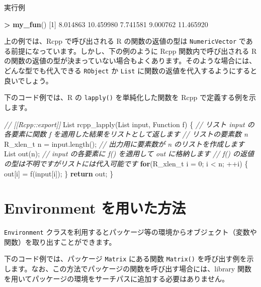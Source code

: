 \documentclass[]{book}
\newenvironment{Shaded}{\begin{snugshade}}{\end{snugshade}}
\newcommand{\CommentTok}[1]{\textcolor[rgb]{0.56,0.35,0.01}{\textit{#1}}}
\newcommand{\ControlFlowTok}[1]{\textcolor[rgb]{0.13,0.29,0.53}{\textbf{#1}}}
\newcommand{\DataTypeTok}[1]{\textcolor[rgb]{0.13,0.29,0.53}{#1}}
\newcommand{\DecValTok}[1]{\textcolor[rgb]{0.00,0.00,0.81}{#1}}
\newcommand{\FloatTok}[1]{\textcolor[rgb]{0.00,0.00,0.81}{#1}}
\newcommand{\KeywordTok}[1]{\textcolor[rgb]{0.13,0.29,0.53}{\textbf{#1}}}
\newcommand{\NormalTok}[1]{#1}
\newcommand{\OperatorTok}[1]{\textcolor[rgb]{0.81,0.36,0.00}{\textbf{#1}}}
\newcommand{\StringTok}[1]{\textcolor[rgb]{0.31,0.60,0.02}{#1}}
\begin{document}
実行例

\begin{Shaded}
\begin{Highlighting}[]
\OperatorTok{>}\StringTok{ }\KeywordTok{my_fun}\NormalTok{()}
\NormalTok{[}\DecValTok{1}\NormalTok{]  }\FloatTok{8.014863} \FloatTok{10.459980}  \FloatTok{7.741581}  \FloatTok{9.000762} \FloatTok{11.465920}
\end{Highlighting}
\end{Shaded}

上の例では、Rcpp で呼び出される R の関数の返値の型は \texttt{NumericVector} である前提になっています。しかし、下の例のように Rcpp 関数内で呼び出される R の関数の返値の型が決まっていない場合もよくあります。そのような場合には、どんな型でも代入できる \texttt{RObject} か \texttt{List} に関数の返値を代入するようにすると良いでしょう。

下のコード例では、R の \texttt{lapply()} を単純化した関数を Rcpp で定義する例を示します。

\begin{Shaded}
\begin{Highlighting}[]
\CommentTok{// [[Rcpp::export]]}
\NormalTok{List rcpp_lapply(List input, Function f) \{}
    \CommentTok{// リスト input の各要素に関数 f を適用した結果をリストとして返します}
    \CommentTok{// リストの要素数 n}
    \DataTypeTok{R_xlen_t}\NormalTok{ n = input.length();}
    \CommentTok{// 出力用に要素数が n のリストを作成します}
\NormalTok{    List out(n);}
    \CommentTok{// input の各要素に f() を適用して out に格納します}
    \CommentTok{// f() の返値の型は不明ですがリストには代入可能です}
    \ControlFlowTok{for}\NormalTok{(}\DataTypeTok{R_xlen_t}\NormalTok{ i = }\DecValTok{0}\NormalTok{; i < n; ++i) \{}
\NormalTok{        out[i] = f(input[i]);}
\NormalTok{    \}}
    \ControlFlowTok{return}\NormalTok{ out;}
\NormalTok{\}}
\end{Highlighting}
\end{Shaded}

\hypertarget{environment-}{%
\section{Environment を用いた方法}\label{environment-}}

\texttt{Environment} クラスを利用するとパッケージ等の環境からオブジェクト（変数や関数）を取り出すことができます。

下のコード例では、パッケージ \texttt{Matrix} にある関数 \texttt{Matrix()} を呼び出す例を示します。なお、この方法でパッケージの関数を呼び出す場合には、library 関数を用いてパッケージの環境をサーチパスに追加する必要はありません。
\end{document}

